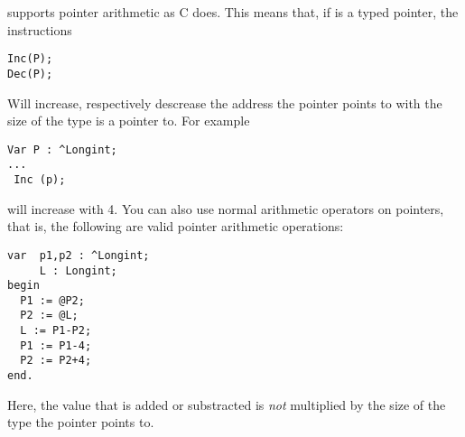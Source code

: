 \documentclass{report}
\begin{document}
\fpc supports pointer arithmetic as C does. This means that, if  is a
typed pointer, the instructions
\begin{verbatim}
Inc(P);
Dec(P);
\end{verbatim}
Will increase, respectively descrease the address the pointer points to
with the size of the type  is a pointer to. For example
\begin{verbatim}
Var P : ^Longint;
...
 Inc (p);
\end{verbatim}
will increase  with 4.
You can also use normal arithmetic operators on pointers, that is, the
following are valid pointer arithmetic operations:
\begin{verbatim}
var  p1,p2 : ^Longint;
     L : Longint;
begin
  P1 := @P2;
  P2 := @L;
  L := P1-P2;
  P1 := P1-4;
  P2 := P2+4;
end.
\end{verbatim}
Here, the value that is added or substracted is {\em not} multiplied by the
size of the type the pointer points to.

\end{document}
